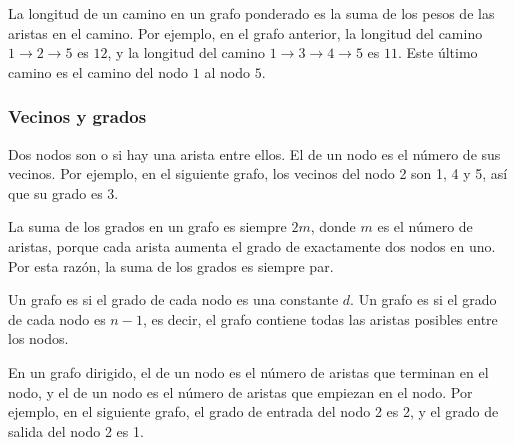 La longitud de un camino en un grafo ponderado
es la suma de los pesos de las aristas en el camino.
Por ejemplo, en el grafo anterior,
la longitud del camino
$1 \rightarrow 2 \rightarrow 5$ es $12$,
y la longitud del camino
$1 \rightarrow 3 \rightarrow 4 \rightarrow 5$ es $11$.
Este último camino es el camino  del nodo $1$ al nodo $5$.

\subsubsection{Vecinos y grados}


Dos nodos son  o 
si hay una arista entre ellos.
El  de un nodo
es el número de sus vecinos.
Por ejemplo, en el siguiente grafo,
los vecinos del nodo 2 son 1, 4 y 5,
así que su grado es 3.

\begin{center}
\end{center}

La suma de los grados en un grafo es siempre $2m$,
donde $m$ es el número de aristas,
porque cada arista
aumenta el grado de exactamente dos nodos en uno.
Por esta razón, la suma de los grados es siempre par.


Un grafo es  si el
grado de cada nodo es una constante $d$.
Un grafo es  si el
grado de cada nodo es $n-1$, es decir,
el grafo contiene todas las aristas posibles
entre los nodos.


En un grafo dirigido, el 
de un nodo es el número de aristas
que terminan en el nodo,
y el  de un nodo
es el número de aristas que empiezan en el nodo.
Por ejemplo, en el siguiente grafo,
el grado de entrada del nodo 2 es 2,
y el grado de salida del nodo 2 es 1.

